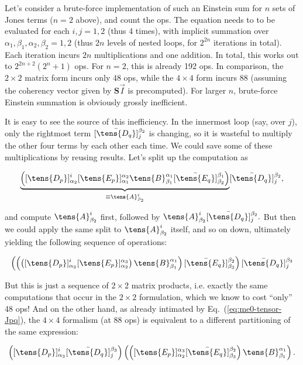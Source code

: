 Let's consider a brute-force implementation of such an Einstein sum for $n$ sets of Jones terms ($n=2$ above), and count the ops. The equation needs to to be evaluated for each $i,j=1,2$ (thus 4 times), with implicit summation over $\alpha_1,\beta_1,\alpha_2,\beta_2=1,2$ (thus $2n$ levels of nested loops, for $2^{2n}$ iterations in total). Each iteration incurs $2n$ multiplications and one addition. In total, this works out to $2^{2n+2}(2^n+1)$ ops. For $n=2$, this is already 192 ops. In comparison, the $2\times2$ matrix form incurs only 48 ops, while the $4\times4$ form incurs 88 (assuming the coherency vector given by $\mathbf{S}\vec I$ is precomputed). For larger $n$, brute-force Einstein summation is obviously grossly inefficient. 

It is easy to see the source of this inefficiency. In the innermost loop (say, over $j$), only the rightmost term $[\bar\tens{D_q}]^{\beta_2}_j$ is changing, so it is wasteful to multiply the other four terms by each other each time. We could save some of these multiplications by reusing results. Let's split up the computation as

\[
  \underbrace{\left(
    [\tens{D_p}]^{i}_{\alpha_2} 
    [\tens{E_p}]^{\alpha_2}_{\alpha_1} 
    \tens{B}^{\alpha_1}_{\beta_1}
    [\bar\tens{E_q}]^{\beta_1}_{\beta_2}\right)
  }_{\equiv\tens{A}^i_{\beta_2}}
  [\bar\tens{D_q}]^{\beta_2}_{j},
\]

and compute $\tens{A}^i_{\beta_2}$ first, followed by $\tens{A}^i_{\beta_2}[\bar\tens{D_q}]_{j}^{\beta_2}.$
But then we could apply the same split to $\tens{A}^i_{\beta_2}$ itself, and so on down, ultimately yielding the following sequence of operations:

\[
  \left(
  \left(
  \left(
    [\tens{D_p}]^{i}_{\alpha_3} 
    [\tens{E_p}]^{\alpha_3}_{\alpha_2}
  \right)
  \tens{B}^{\alpha_1}_{\beta_1}
  \right)
  [\bar\tens{E_q}]^{\beta_2}_{\beta_3}
  \right)
  [\bar\tens{D_q}]^{\beta_3}_{j}
\]

But this is just a sequence of $2\times2$ matrix products, i.e. exactly the same computations that occur in the $2\times2$ formulation, which we know to cost ``only'' 48 ops! And on the other hand, as already intimated by Eq.~(\ref{eq:me0-tensor-Jpq}), the $4\times4$ formalism (at 88 ops) is equivalent to a different partitioning of the same expression:

\[
  \left( 
    [\tens{D_p}]^i_{\alpha_3} [\bar\tens{D_q}]_{j}^{\beta_3} 
  \right) 
  \left(
    \left( 
      [\tens{E_p}]^{\alpha_3}_{\alpha_2} [\bar\tens{E_q}]_{\beta_3}^{\beta_2} 
    \right) 
      \tens{B}^{\alpha_1}_{\beta_1} 
  \right).
 \]

